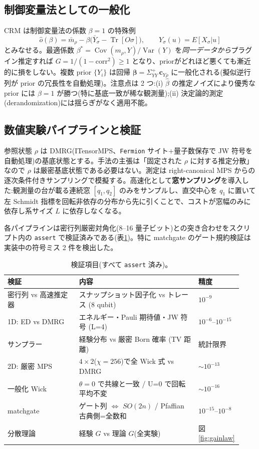 \documentclass[11pt,a4paper]{ltjsarticle}
\newcommand{\Tr}{\operatorname{Tr}}
\newcommand{\Var}{\operatorname{Var}}
\newcommand{\Cov}{\operatorname{Cov}}
\begin{document}
\subsection{制御変量法としての一般化}
\label{sec:cv-method}
CRM は制御変量法の係数 $\beta=1$ の特殊例
\begin{equation}
  \hat o(\beta) = \bar m_\rho - \beta\bigl(\bar Y_\sigma - \Tr[O\sigma]\bigr),\qquad Y_\sigma(u)=E[X_\sigma|u]
\end{equation}
とみなせる。最適係数 $\beta^\ast=\Cov(m_\rho,Y)/\Var(Y)$ を\emph{同一データから}プラグイン推定すれば $G=1/(1-\mathrm{corr}^2)\ge1$ となり、priorがどれほど悪くても漸近的に損をしない。複数 prior $\{Y_i\}$ は回帰 $\boldsymbol\beta = \Sigma_{YY}^{+}\,\mathbf c_{Y\rho}$ に一般化される(擬似逆行列が prior の冗長性を自動処理)。注意点は 2 つ:(i) $\hat\beta$ の推定ノイズにより優秀な prior には $\beta=1$ が勝つ(特に基底一致が稀な観測量);(ii) 決定論的測定(derandomization)には揺らぎがなく適用不能。

\subsection{数値実験パイプラインと検証}
\label{sec:pipeline}
参照状態 $\rho$ は DMRG(ITensorMPS、\texttt{Fermion} サイト+量子数保存で JW 符号を自動処理)の基底状態とする。手法の主張は「固定された $\rho$ に対する推定分散」なので $\rho$ は厳密基底状態である必要はない。測定は right-canonical MPS からの逐次条件付きサンプリングで模擬する。高速化として\textbf{窓サンプリング}を導入した:観測量の台が載る連続窓 $[q_1,q_2]$ のみをサンプルし、直交中心を $q_1$ に置いて左 Schmidt 指標を回転非依存の分布から先に引くことで、コストが窓幅のみに依存し系サイズ $L$ に依存しなくなる。

各パイプラインは密行列厳密対角化(8--16 量子ビット)との突き合わせをスクリプト内の \texttt{assert} で検証済みである(表\ref{tab:validation})。特に matchgate のゲート規約検証は実装中の符号ミス 2 件を検出した。

\begin{table}[t]
\centering\small
\caption{検証項目(すべて \texttt{assert} 済み)。}
\label{tab:validation}
\begin{tabular}{@{}p{0.30\linewidth}p{0.50\linewidth}p{0.13\linewidth}@{}}
\toprule
検証 & 内容 & 精度 \\
\midrule
密行列 vs 高速推定器 & スナップショット因子化 vs トレース (8 qubit) & $10^{-9}$ \\
1D: ED vs DMRG & エネルギー・Pauli 期待値・JW 符号 (L=4) & $10^{-6}$--$10^{-15}$ \\
サンプラー & 経験分布 vs 厳密 Born 確率 (TV 距離) & 統計限界 \\
2D: 厳密 MPS & $4\times2$($\chi=256$)で全 Wick 式 vs DMRG & ${\sim}10^{-13}$ \\
一般化 Wick & $\theta=0$ で共線と一致 / U=0 で回転平均不変 & ${\sim}10^{-16}$ \\
matchgate & ゲート列 $\Leftrightarrow$ $SO(2n)$ / Pfaffian 古典側=全数和 & $10^{-15}$--$10^{-8}$ \\
分散理論 & 経験 $G$ vs 理論 $G$(全実験) & 図\ref{fig:gainlaw} \\
\bottomrule
\end{tabular}
\end{table}
\end{document}
